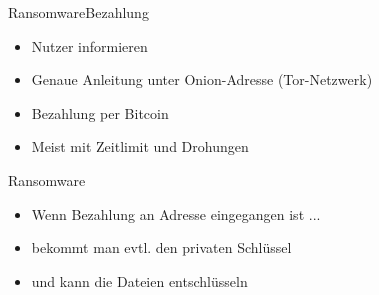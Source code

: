 \documentclass[10pt]{beamer}
\begin{document}
\begin{frame}{Ransomware}{Bezahlung}
	\begin{itemize}
		\item Nutzer informieren
		\item Genaue Anleitung unter Onion-Adresse (Tor-Netzwerk)
		\item Bezahlung per Bitcoin
		\item Meist mit Zeitlimit und Drohungen
	\end{itemize}
\end{frame}


\begin{frame}{Ransomware}
	\begin{itemize}
		\item Wenn Bezahlung an Adresse eingegangen ist ...
		\item bekommt man evtl. den privaten Schlüssel
		\item und kann die Dateien entschlüsseln
	\end{itemize}
\end{frame}
\end{document}
